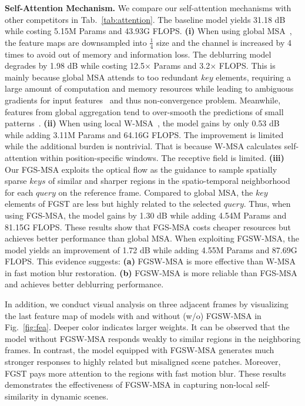 \documentclass{article}
\begin{document}
	\noindent\textbf{Self-Attention Mechanism.} We compare our self-attention mechanisms with other competitors in Tab.~\ref{tab:attention}. The baseline model yields 31.18 dB while costing 5.15M Params and 43.93G FLOPS. \textbf{(i)} When using global MSA~\cite{global_msa}, the feature maps are downsampled into $\frac{1}{4}$ size and the channel is increased by 4 times to avoid out of memory and information loss. The deblurring model degrades by 1.98 dB while costing 12.5$\times$ Params and 3.2$\times$ FLOPS. This is mainly because global MSA attends to too redundant $key$ elements, requiring a large amount of computation and memory resources while leading to ambiguous gradients for input features~\cite{de_detr} and thus non-convergence problem. Meanwhile, features from global aggregation tend to over-smooth the predictions of small patterns~\cite{xiangtl_gald}. \textbf{(ii)} When using local W-MSA~\cite{liu2021swin}, the model gains by only 0.53 dB while adding 3.11M Params and 64.16G FLOPS. The improvement is limited while the additional burden is nontrivial. That is because W-MSA calculates self-attention within position-specific windows. The receptive field is limited. \textbf{(iii)} Our FGS-MSA exploits the optical flow as the guidance to sample spatially sparse $keys$ of similar and sharper regions in the spatio-temporal neighborhood for each $query$ on the reference frame. Compared to global MSA, the $key$ elements of FGST are less but highly related to the selected $query$. Thus, when using FGS-MSA, the model gains by 1.30 dB while adding 4.54M Params and 81.15G FLOPS. These results show that FGS-MSA costs cheaper resources but achieves better performance than global MSA. When exploiting FGSW-MSA, the model yields an improvement of 1.72 dB while adding 4.55M Params and 87.69G FLOPS. This evidence suggests: \textbf{(a)} FGSW-MSA is more effective than W-MSA in fast motion blur restoration. \textbf{(b)} FGSW-MSA is more reliable than FGS-MSA and achieves better deblurring performance.
	
	In addition, we conduct visual analysis on three adjacent frames by visualizing the last feature map of models with and without (w/o) FGSW-MSA in Fig.~\ref{fig:fea}. Deeper color indicates larger weights. It can be observed that the model without FGSW-MSA responds weakly to similar regions in the neighboring frames. In contrast, the model equipped with FGSW-MSA generates much stronger responses to highly related but misaligned scene patches. Moreover, FGST pays more attention to the regions with fast motion blur. These results demonstrates the effectiveness of FGSW-MSA in capturing non-local self-similarity in dynamic scenes.
	
\end{document}
